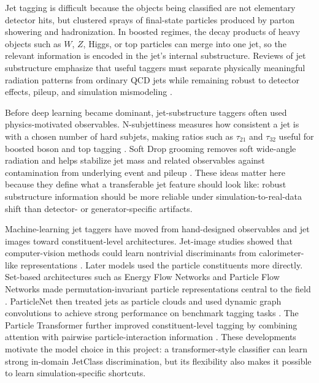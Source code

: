 \documentclass[11pt]{article}
\begin{document}
Jet tagging is difficult because the objects being classified are not elementary detector hits, but clustered sprays of final-state particles produced by parton showering and hadronization. In boosted regimes, the decay products of heavy objects such as $W$, $Z$, Higgs, or top particles can merge into one jet, so the relevant information is encoded in the jet's internal substructure. Reviews of jet substructure emphasize that useful taggers must separate physically meaningful radiation patterns from ordinary QCD jets while remaining robust to detector effects, pileup, and simulation mismodeling \cite{larkoski2017jet,kogler2019jet}.

Before deep learning became dominant, jet-substructure taggers often used physics-motivated observables. N-subjettiness measures how consistent a jet is with a chosen number of hard subjets, making ratios such as $\tau_{21}$ and $\tau_{32}$ useful for boosted boson and top tagging \cite{thaler2011nsubjettiness,thaler2012nsubjettiness}. Soft Drop grooming removes soft wide-angle radiation and helps stabilize jet mass and related observables against contamination from underlying event and pileup \cite{larkoski2014softdrop}. These ideas matter here because they define what a transferable jet feature should look like: robust substructure information should be more reliable under simulation-to-real-data shift than detector- or generator-specific artifacts.

Machine-learning jet taggers have moved from hand-designed observables and jet images toward constituent-level architectures. Jet-image studies showed that computer-vision methods could learn nontrivial discriminants from calorimeter-like representations \cite{cogan2015jetimages,deoliveira2016jetimages}. Later models used the particle constituents more directly. Set-based architectures such as Energy Flow Networks and Particle Flow Networks made permutation-invariant particle representations central to the field \cite{komiske2019energy}. ParticleNet then treated jets as particle clouds and used dynamic graph convolutions to achieve strong performance on benchmark tagging tasks \cite{qu2020particlenet}. The Particle Transformer further improved constituent-level tagging by combining attention with pairwise particle-interaction information \cite{qu2022particle}. These developments motivate the model choice in this project: a transformer-style classifier can learn strong in-domain JetClass discrimination, but its flexibility also makes it possible to learn simulation-specific shortcuts.
\end{document}
